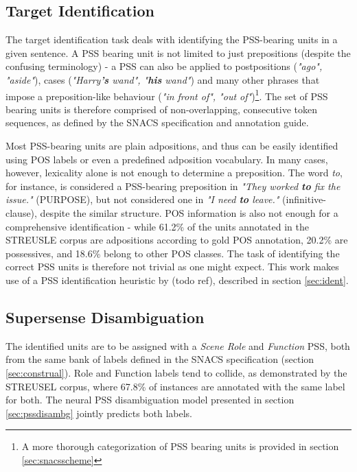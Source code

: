 \subsection{Target Identification}\label{sec:probform_ident}
The target identification task deals with identifying the PSS-bearing units in a given sentence. A PSS bearing unit is not limited to just prepositions (despite the confusing terminology) - a PSS can also be applied to postpositions (\emph{"ago", "aside"}), cases (\emph{"Harry\textbf{'s} wand", "\textbf{his} wand"}) and many other phrases that impose a preposition-like behaviour (\emph{"in front of", "out of"})\footnote{A more thorough categorization of PSS bearing units is provided in section \ref{sec:snacsscheme}}.  The set of PSS bearing units is therefore comprised of non-overlapping, consecutive token sequences, as defined by the SNACS specification and annotation guide. 

Most PSS-bearing units are plain adpositions, and thus can be easily identified using POS labels or even a predefined adposition vocabulary. In many cases, however, lexicality alone is not enough to determine a preposition. The word \emph{to}, for instance, is considered a PSS-bearing preposition in \emph{"They worked \textbf{to} fix the issue."} (PURPOSE), but not considered one in \emph{"I need \textbf{to} leave."} (infinitive-clause), despite the similar structure. POS information is also not enough for a comprehensive identification - while 61.2\% of the units annotated in the STREUSLE corpus are adpositions according to gold POS annotation, 20.2\% are possessives, and 18.6\% belong
to other POS classes. The task of identifying the correct PSS units is therefore not trivial as one might expect. This work makes use of a PSS identification heuristic by (todo ref), described in section \ref{sec:ident}.

\subsection{Supersense Disambiguation}\label{sec:probform_disam}

The identified units are to be assigned with a \emph{Scene Role} and \emph{Function} PSS, both from the same bank of labels defined in the SNACS specification (section \ref{sec:construal}). Role and Function labels tend to collide, as demonstrated by the STREUSEL corpus, where 67.8\% of instances are annotated with the same label for both. The neural PSS disambiguation model presented in section \ref{sec:pssdisambg} jointly predicts both labels.

